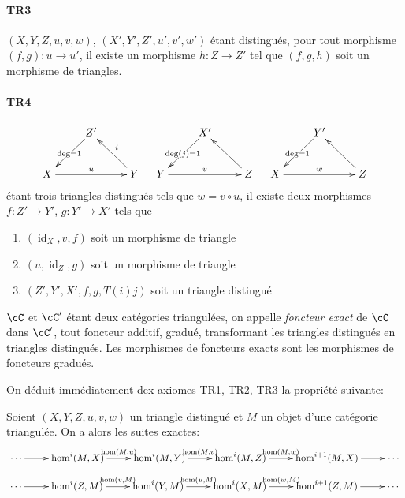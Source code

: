 \paragraph{TR3}
\hypertarget{VIII:TR3}{}

$(X,Y,Z,u,v,w)$, $(X',Y',Z',u',v',w')$ \'etant distingu\'es, pour tout 
morphisme $(f,g):u\to u'$, il existe un morphisme $h:Z\to Z'$ tel que $(f,g,h)$ 
soit un morphisme de triangles. 


\paragraph{TR4}
\hypertarget{VIII:TR4}{}

\[\xymatrix{
  & Z' \ar[dl]|{\deg=1} \\
  X \ar[rr]^-u 
    & & Y \ar[ul]_-i 
}\quad
\xymatrix{
  & X' \ar[dl]|{\deg(j)=1} \\
  Y \ar[rr]^-v 
    & & Z \ar[ul] 
}\quad
\xymatrix{
  & Y' \ar[dl]|{\deg=1} \\
  X \ar[rr]^-w 
    & & Z \ar[ul] 
}\]
\'etant trois triangles distingu\'es tels que $w=v\circ u$, il existe deux 
morphismes $f:Z'\to Y'$, $g:Y' \to X'$ tels que 
\begin{enumerate}
  \item $(\operatorname{id}_X, v, f)$ soit un morphisme de triangle 
  \item $(u,\operatorname{id}_Z,g)$ soit un morphisme de triangle 
  \item $(Z',Y',X',f,g,T(i) j)$ soit un triangle distingu\'e
\end{enumerate}

$\cC$ et $\cC'$ \'etant deux cat\'egories triangul\'ees, on appelle 
\emph{foncteur exact} de $\cC$ dans $\cC'$, tout foncteur additif, gradu\'e, 
transformant les triangles distingu\'es en triangles distingu\'es. Les 
morphismes de foncteurs exacts sont les morphismes de foncteurs gradu\'es. 

On d\'eduit imm\'ediatement dex axiomes \hyperlink{VIII:TR1}{TR1}, 
\hyperlink{VIII:TR2}{TR2}, \hyperlink{VIII:TR3}{TR3} la propri\'et\'e suivante: 





\begin{proposition}\label{VIII:1-1-2}
Soient $(X,Y,Z,u,v,w)$ un triangle distingu\'e et $M$ un objet d'une 
cat\'egorie triangul\'ee. On a alors les suites exactes: 
\[\xymatrix{
  \cdots \ar[r] 
    & \hom^i(M,X) \ar[r]^-{\hom(M,u)} 
    & \hom^i(M,Y) \ar[r]^-{\hom(M,v)} 
    & \hom^i(M,Z) \ar[r]^-{\hom(M,w)} 
    & \hom^{i+1}(M,X) \ar[r] 
    & \cdots
}\]
\[\xymatrix{
  \cdots \ar[r] 
    & \hom^i(Z,M) \ar[r]^-{\hom(v,M)} 
    & \hom^i(Y,M) \ar[r]^-{\hom(u,M)} 
    & \hom^i(X,M) \ar[r]^-{\hom(w,M)} 
    & \hom^{i+1}(Z,M) \ar[r] 
    & \cdots
}\]
\end{proposition}


